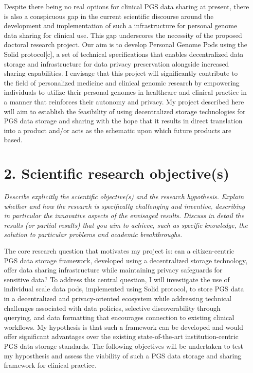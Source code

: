 \documentclass[11pt]{article}
\begin{document}
Despite there being no real options for clinical PGS data sharing at present, there is also a conspicuous gap in the current scientific discourse around the development and implementation of such a infrastructure for personal genome data sharing for clinical use. 
This gap underscores the necessity of the proposed doctoral research project.
Our aim is to develop Personal Genome Pods using the Solid protocol[c], a set of technical specifications that enables decentralized data storage and infrastructure for data privacy preservation alongside increased sharing capabilities.  
I envisage that this project will significantly contribute to the field of personalized medicine and clinical genomic research by empowering individuals to utilize their personal genomes in healthcare and clinical practice in a manner that reinforces their autonomy and privacy. 
My project described here will aim to establish the feasibility of using decentralized storage technologies for PGS data storage and sharing with the hope that it results in direct translation into a product and/or acts as the schematic upon which future products are based. 


\section{2. Scientific research objective(s)}
\textit{Describe explicitly the scientific objective(s) and the research hypothesis. Explain whether and how the research is specifically challenging and inventive, describing in particular the innovative aspects of the envisaged results. Discuss in detail the results (or partial results) that you aim to achieve, such as specific knowledge, the solution to particular problems and academic breakthroughs.}

The core research question that motivates my project is: can a citizen-centric PGS data storage framework, developed using a decentralized storage technology, offer data sharing infrastructure while maintaining privacy safeguards for sensitive data? 
To address this central question, I will investigate the use of individual scale data pods, implemented using Solid protocol, to store PGS data in a decentralized and privacy-oriented ecosystem while addressing technical challenges associated with data policies, selective discoverability through querying, and data formatting that encourages connection to existing clinical workflows. 
My hypothesis is that such a framework can be developed and would offer significant advantages over the existing state-of-the-art institution-centric PGS data storage standards. 
The following objectives will be undertaken to test my hyposthesis and assess the viability of such a PGS data storage and sharing framework for clinical practice.
\end{document}
